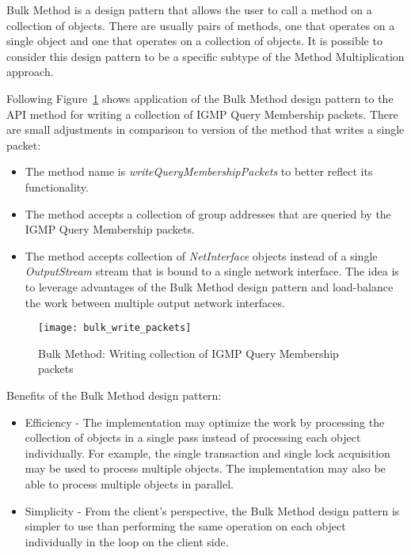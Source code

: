 Bulk Method is a design pattern that allows the user to call a method on a collection of objects.
There are usually pairs of methods, one that operates on a single object and one that operates
on a collection of objects.
It is possible to consider this design pattern to be a specific subtype of the Method Multiplication approach.

Following Figure~\ref{fig:bulk_write_packets} shows application of the Bulk Method design pattern to the
API method for writing a collection of IGMP Query Membership packets.
There are small adjustments in comparison to version of the method that writes a single packet:

\begin{itemize}
    \item The method name is \textit{writeQueryMembershipPackets} to better reflect its functionality.
    \item The method accepts a collection of group addresses that are queried by the IGMP Query Membership packets.
    \item The method accepts collection of \textit{NetInterface} objects instead of a single \textit{OutputStream}
    stream that is bound to a single network interface.
    The idea is to leverage advantages of the Bulk Method design pattern and load-balance the work between multiple
    output network interfaces.
\end{itemize}

\begin{figure}[!htb]
    \centering
    \texttt{[image: bulk\_write\_packets]}
    \caption{Bulk Method: Writing collection of IGMP Query Membership packets}
    \label{fig:bulk_write_packets}
\end{figure}

Benefits of the Bulk Method design pattern:

\begin{itemize}
    \item Efficiency - The implementation may optimize the work by processing the collection of objects
    in a single pass instead of processing each object individually.
    For example, the single transaction and single lock acquisition may be used to process multiple objects.
    The implementation may also be able to process multiple objects in parallel.
    \item Simplicity - From the client's perspective, the Bulk Method design pattern is simpler to use than
    performing the same operation on each object individually in the loop on the client side.
\end{itemize}

